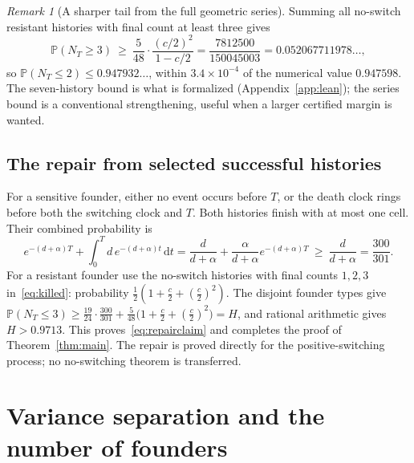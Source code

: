 \documentclass[11pt,a4paper]{article}
\theoremstyle{plain}
\theoremstyle{definition}
\theoremstyle{remark}
\newtheorem{remark}[theorem]{Remark}
\newcommand{\PP}{\mathbb P}
\newcommand{\dd}{\mathrm d}
\begin{document}
\begin{remark}[A sharper tail from the full geometric series]\label{rem:geometric}
Summing all no-switch resistant histories with final count at least three gives
\begin{equation}\label{eq:geometric}
\PP(N_T\ge3)\ \ge\ \frac5{48}\cdot\frac{(c/2)^2}{1-c/2}=\frac{7812500}{150045003}=0.052067711978\ldots ,
\end{equation}
so $\PP(N_T\le2)\le0.947932\ldots$, within $3.4\times10^{-4}$ of the numerical value $0.947598$. The seven-history bound is what is formalized (Appendix~\ref{app:lean}); the series bound is a conventional strengthening, useful when a larger certified margin is wanted.
\end{remark}

\subsection{The repair from selected successful histories}\label{sec:repair}
For a sensitive founder, either no event occurs before $T$, or the death clock rings before both the switching clock and $T$. Both histories finish with at most one cell. Their combined probability is
\begin{equation}\label{eq:sensitive}
e^{-(d+\alpha)T}+\int_0^T d\,e^{-(d+\alpha)t}\,\dd t=\frac d{d+\alpha}+\frac\alpha{d+\alpha}e^{-(d+\alpha)T}\ \ge\ \frac d{d+\alpha}=\frac{300}{301}.
\end{equation}
For a resistant founder use the no-switch histories with final counts $1,2,3$ in~\eqref{eq:killed}: probability $\frac12(1+\frac c2+(\frac c2)^2)$. The disjoint founder types give $\PP(N_T\le3)\ge\frac{19}{24}\cdot\frac{300}{301}+\frac5{48}\bigl(1+\frac c2+(\frac c2)^2\bigr)=H$, and rational arithmetic gives $H>0.9713$. This proves~\eqref{eq:repairclaim} and completes the proof of Theorem~\ref{thm:main}. The repair is proved directly for the positive-switching process; no no-switching theorem is transferred.

\section{Variance separation and the number of founders}\label{sec:founders}
\end{document}
